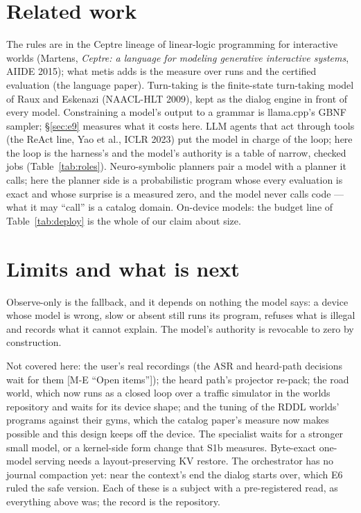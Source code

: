 \documentclass[11pt]{article}
\newcommand{\src}[1]{{\footnotesize\textsf{[#1]}}}
\begin{document}
\section{Related work}\label{sec:related}

The rules are in the Ceptre lineage of linear-logic programming for interactive worlds
(Martens, \emph{Ceptre: a language for modeling generative interactive systems}, AIIDE
2015); what metis adds is the measure over runs and the certified evaluation (the language
paper). Turn-taking is the finite-state turn-taking model of Raux and Eskenazi (NAACL-HLT
2009), kept as the dialog engine in front of every model. Constraining a model's output to
a grammar is llama.cpp's GBNF sampler; \S\ref{sec:e9} measures what it costs here. LLM
agents that act through
tools (the ReAct line, Yao et al., ICLR 2023) put the model in charge of the loop; here the
loop is the harness's and the model's authority is a table of narrow, checked jobs
(Table~\ref{tab:roles}). Neuro-symbolic planners pair a model with a planner it calls; here
the planner side is a probabilistic program whose every evaluation is exact and whose
surprise is a measured zero, and the model never calls code --- what it may ``call'' is a
catalog domain. On-device models: the budget line of Table~\ref{tab:deploy} is the whole of
our claim about size.

\section{Limits and what is next}\label{sec:limits}

Observe-only is the fallback, and it depends on nothing the model says: a device whose
model is wrong, slow or absent still runs its program, refuses what is illegal and records
what it cannot explain. The model's authority is revocable to zero by construction.

Not covered here: the user's real recordings (the ASR and heard-path decisions wait for
them \src{M-E ``Open items''}); the heard path's projector re-pack; the road world, which
now runs as a closed loop over a traffic simulator in the worlds repository and waits for
its device shape; and the tuning of the RDDL worlds' programs against their gyms,
which the catalog paper's measure now makes possible and this design keeps off the device.
The specialist waits for a stronger small model, or a kernel-side form change that S1b
measures. Byte-exact one-model serving needs a layout-preserving KV restore. The orchestrator
has no journal compaction yet: near the context's end the dialog starts over, which E6 ruled
the safe version. Each of these is a subject with a pre-registered read, as everything above
was; the record is the repository.
\end{document}
